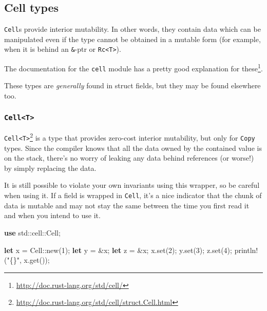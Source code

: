\documentclass[a4paper,]{book}
\newenvironment{Shaded}{\begin{snugshade}}{\end{snugshade}}
\newcommand{\KeywordTok}[1]{\textcolor[rgb]{0.13,0.29,0.53}{\textbf{{#1}}}}
\newcommand{\DecValTok}[1]{\textcolor[rgb]{0.00,0.00,0.81}{{#1}}}
\newcommand{\StringTok}[1]{\textcolor[rgb]{0.31,0.60,0.02}{{#1}}}
\newcommand{\OtherTok}[1]{\textcolor[rgb]{0.56,0.35,0.01}{{#1}}}
\newcommand{\NormalTok}[1]{{#1}}
\renewcommand{\href}[2]{#2\footnote{\url{#1}}}
\begin{document}
\subsection{Cell types}\label{cell-types}

\texttt{Cell}s provide interior mutability. In other words, they contain
data which can be manipulated even if the type cannot be obtained in a
mutable form (for example, when it is behind an \texttt{\&}-ptr or
\texttt{Rc\textless{}T\textgreater{}}).

\href{http://doc.rust-lang.org/std/cell/}{The documentation for the
\texttt{cell} module has a pretty good explanation for these}.

These types are \emph{generally} found in struct fields, but they may be
found elsewhere too.

\subsubsection{\texorpdfstring{\texttt{Cell\textless{}T\textgreater{}}}{Cell\textless{}T\textgreater{}}}\label{cellt}

\href{http://doc.rust-lang.org/std/cell/struct.Cell.html}{\texttt{Cell\textless{}T\textgreater{}}}
is a type that provides zero-cost interior mutability, but only for
\texttt{Copy} types. Since the compiler knows that all the data owned by
the contained value is on the stack, there's no worry of leaking any
data behind references (or worse!) by simply replacing the data.

It is still possible to violate your own invariants using this wrapper,
so be careful when using it. If a field is wrapped in \texttt{Cell},
it's a nice indicator that the chunk of data is mutable and may not stay
the same between the time you first read it and when you intend to use
it.

\begin{Shaded}
\begin{Highlighting}[]
\KeywordTok{use} \NormalTok{std::cell::Cell;}

\KeywordTok{let} \NormalTok{x = Cell::new(}\DecValTok{1}\NormalTok{);}
\KeywordTok{let} \NormalTok{y = &x;}
\KeywordTok{let} \NormalTok{z = &x;}
\NormalTok{x.set(}\DecValTok{2}\NormalTok{);}
\NormalTok{y.set(}\DecValTok{3}\NormalTok{);}
\NormalTok{z.set(}\DecValTok{4}\NormalTok{);}
\OtherTok{println!}\NormalTok{(}\StringTok{"\{\}"}\NormalTok{, x.get());}
\end{Highlighting}
\end{Shaded}
\end{document}
